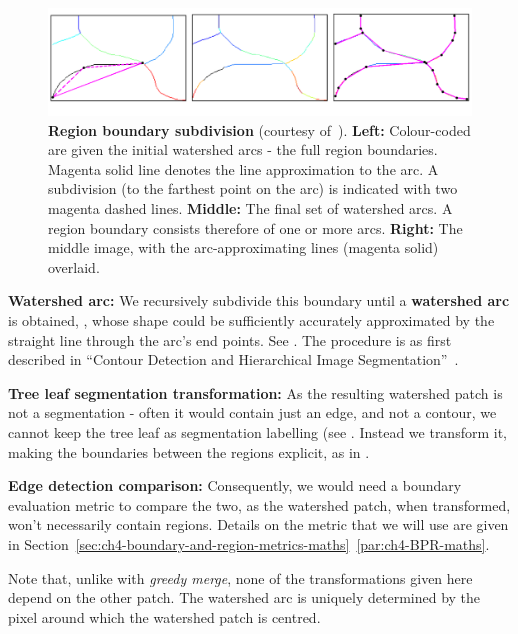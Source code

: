 \begin{figure}[ht!]
 \centering
 \includegraphics[width=1\textwidth]{images/SE-SV-UCM/Arbelaez11-contour-subdivision.png}
 \caption[Region boundary subdivision]{{\bf Region boundary subdivision} (courtesy of~\cite{Arbelaez11}). {\bf Left:} Colour-coded are given the initial watershed arcs - the full region boundaries. Magenta solid line denotes the line approximation to the arc. A subdivision (to the farthest point on the arc) is indicated with two magenta dashed lines. {\bf Middle:} The final set of watershed arcs. A region boundary consists therefore of one or more arcs. {\bf Right:} The middle image, with the arc-approximating lines (magenta solid) overlaid.}
 \label{fig:Arbelaez11-contour-subdivision}
\end{figure}

\textbf{Watershed arc:} We recursively subdivide this boundary until a \textbf{watershed arc} is obtained, , whose shape could be sufficiently accurately approximated by the straight line through the arc's end points. See . The procedure is as first described in ``Contour Detection and Hierarchical Image Segmentation''~\cite{Arbelaez11}.

\textbf{Tree leaf segmentation transformation:} As the resulting watershed patch is not a segmentation - often it would contain just an edge, and not a contour, we cannot keep the tree leaf as segmentation labelling (see . Instead we transform it, making the boundaries between the regions explicit, as in .

\textbf{Edge detection comparison:} Consequently, we would need a boundary evaluation metric to compare the two, as the watershed patch, when transformed, won't necessarily contain regions. Details on the metric that we will use are given in Section~\ref*{sec:ch4-boundary-and-region-metrics-maths}~\ref{par:ch4-BPR-maths}.

Note that, unlike with \textit{greedy merge}, none of the transformations given here depend on the other patch. The watershed arc is uniquely determined by the pixel around which the watershed patch is centred.

